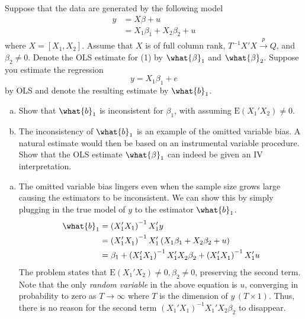 \documentclass[answers]{exam}
\begin{document}
\begin{questions}
\begin{solution}
  \end{solution}
  \question
  Suppose that the data are generated by the following model
  \begin{align}
    y &= X\beta+u\\
      &= X_{1}\beta_{1}+X_{2}\beta_{2}+u
  \end{align}
  where $X=\left[X_{1},X_{2}\right]$. Assume that $X$ is of full column rank, $T^{-1}X'X\xrightarrow{p}Q$, and $\beta_{2}\neq 0$. Denote the OLS estimate for (1) by $\what{\beta}_{1}$ and $\what{\beta}_{2}$. Suppose you estimate the regression
  \begin{equation}
    y=X_{1}\beta_{1}+e
  \end{equation}
  by OLS and denote the resulting estimate by $\what{b}_{1}$.
  \begin{enumerate}[a)]
    \item Show that $\what{b}_{1}$ is inconsistent for $\beta_{1}$, with assuming $\mathrm{E}\left(X_{1}'X_{2}^{}\right)\neq 0$.
    \item The inconsistency of $\what{b}_{1}$ is an example of the omitted variable bias. A natural estimate would then be based on an instrumental variable procedure. Show that the OLS estimate $\what{\beta}_{1}$ can indeed be given an IV interpretation.
  \end{enumerate}
  \begin{solution}
    \begin{enumerate}[a)]
      \item The omitted variable bias lingers even when the sample size grows large causing the estimators to be inconsistent. We can show this by simply plugging in the true model of $y$ to the estimator $\what{b}_{1}$.
      \begin{align}
        \what{b}_{1} &= \left(X_{1}'X_{1}\right)^{-1}X_{1}'y\\
        &= \left(X_{1}'X_{1}^{}\right)^{-1}X_{1}'\left(X_{1}\beta_{1}+X_{2}\beta_{2}+u\right)\\
        &= \beta_{1}+\left(X_{1}'X_{1}^{}\right)^{-1}X_{1}'X_{2}^{}\beta_{2}^{}+\left(X_{1}'X_{1}^{}\right)^{-1}X_{1}'u
      \end{align}
      The problem states that $\mathrm{E}\left(X_{1}'X_{2}^{}\right)\neq 0, \beta_{2}\neq 0$, preserving the second term. Note that the only \emph{random variable} in the above equation is $u$, converging in probability to zero as $T\to\infty$ where $T$ is the dimension of $y\, \left(T\times 1\right)$. Thus, there is no reason for the second term $\left(X_{1}'X_{1}^{}\right)^{-1}X_{1}'X_{2}^{}\beta_{2}^{}$ to disappear.

\end{enumerate}
\end{solution}
\end{questions}
\end{document}

